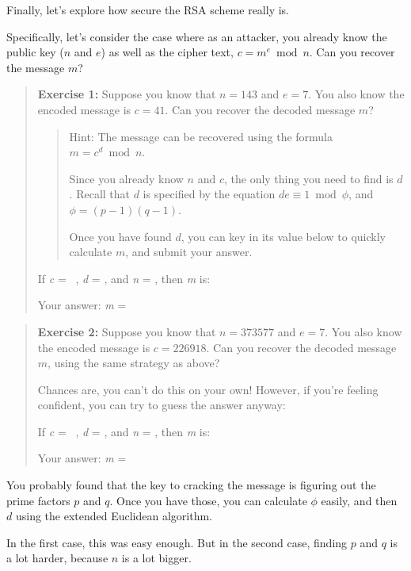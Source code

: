 \documentclass[
  letterpaper,
  DIV=11,
  numbers=noendperiod]{scrreprt}
\begin{document}
Finally, let's explore how secure the RSA scheme really is.

Specifically, let's consider the case where as an attacker, you already
know the public key (\(n\) and \(e\)) as well as the cipher text,
\(c = m^e \bmod n\). Can you recover the message \(m\)?

\begin{quote}
\textbf{Exercise 1:} Suppose you know that \(n = 143\) and \(e = 7\).
You also know the encoded message is \(c = 41\). Can you recover the
decoded message \(m\)?

\begin{quote}
Hint: The message can be recovered using the formula
\(m = c^d \bmod n\).

Since you already know \(n\) and \(c\), the only thing you need to find
is \(d\). Recall that \(d\) is specified by the equation
\(de \equiv 1 \bmod \phi\), and \(\phi = (p - 1)(q - 1)\).

Once you have found \(d\), you can key in its value below to quickly
calculate \(m\), and submit your answer.
\end{quote}

If \emph{c} = ~, \emph{d} = , and \emph{n} = , then \emph{m} is:

Your answer: \emph{m} = ~ ~~~~\protect\hypertarget{m1-result}{}{}
\end{quote}

\begin{quote}
\textbf{Exercise 2:} Suppose you know that \(n = 373577\) and \(e = 7\).
You also know the encoded message is \(c = 226918\). Can you recover the
decoded message \(m\), using the same strategy as above?

Chances are, you can't do this on your own! However, if you're feeling
confident, you can try to guess the answer anyway:

If \emph{c} = ~, \emph{d} = , and \emph{n} = , then \emph{m} is:

Your answer: \emph{m} = ~ ~~~~\protect\hypertarget{m2-result}{}{}
\end{quote}

You probably found that the key to cracking the message is figuring out
the prime factors \(p\) and \(q\). Once you have those, you can
calculate \(\phi\) easily, and then \(d\) using the extended Euclidean
algorithm.

In the first case, this was easy enough. But in the second case, finding
\(p\) and \(q\) is a lot harder, because \(n\) is a lot bigger.
\end{document}
